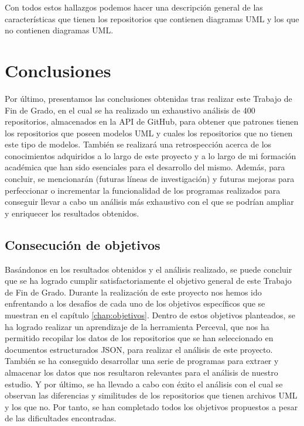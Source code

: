 \documentclass[a4paper, 12pt]{book}
\begin{document}
Con todos estos hallazgos podemos hacer una descripción general de las características que tienen los repositorios que contienen diagramas UML y los que no contienen diagramas UML.


\cleardoublepage
\chapter{Conclusiones}
\label{chap:conclusiones}

Por último, presentamos las conclusiones obtenidas tras realizar este Trabajo de Fin de Grado, en el cual se ha realizado un exhaustivo análisis de 400 repositorios, almacenados en la API de GitHub, para obtener que patrones tienen los repositorios que poseen modelos UML y cuales los repositorios que no tienen este tipo de modelos. 
También se realizará una retrospección acerca de los conocimientos adquiridos a lo largo de este proyecto y a lo largo de mi formación académica que han sido esenciales para el desarrollo del mismo.
Además, para concluir, se mencionarán  (futuras líneas de investigación) y futuras mejoras para perfeccionar o incrementar la funcionalidad de los programas realizados para conseguir llevar a cabo un análisis más exhaustivo con el que se podrían ampliar y enriquecer los resultados obtenidos.


\section{Consecución de objetivos}
\label{sec:consecucion-objetivos}

Basándonos en los resultados obtenidos y el análisis realizado, se puede concluir que se ha logrado cumplir satisfactoriamente el objetivo general de este Trabajo de Fin de Grado.
Durante la realización de este proyecto nos hemos ido enfrentando a los desafíos de cada uno de los objetivos específicos que se muestran en el capítulo \ref{chap:objetivos}.
Dentro de estos objetivos planteados, se ha logrado realizar un aprendizaje de la herramienta Perceval, que nos ha permitido recopilar los datos de los repositorios que se han seleccionado en documentos estructurados JSON, para realizar el análisis de este proyecto. 
También se ha conseguido desarrollar una serie de programas para extraer y almacenar los datos que nos resultaron relevantes para el análisis de nuestro estudio.
Y por último, se ha llevado a cabo con éxito el análisis con el cual se observan las diferencias y similitudes de los repositorios que tienen archivos UML y los que no.
Por tanto, se han completado todos los objetivos propuestos a pesar de las dificultades encontradas.
\end{document}
